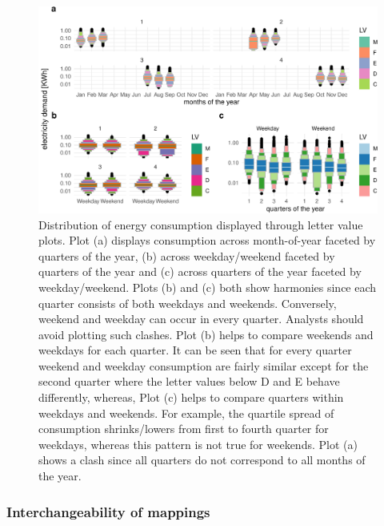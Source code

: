 \documentclass[12pt]{article}
\begin{document}
\begin{figure}

\includegraphics[width=1\linewidth]{figure/allFig-1} \hfill{}

\caption{Distribution of energy consumption displayed through letter value plots. Plot (a) displays consumption across month-of-year faceted by quarters of the year, (b) across weekday/weekend faceted by quarters of the year and (c) across quarters of the year faceted by weekday/weekend. Plots (b) and (c) both show harmonies since each quarter consists of both weekdays and weekends. Conversely, weekend and weekday can occur in every quarter. Analysts should avoid plotting such clashes. Plot (b) helps to compare weekends and weekdays for each quarter. It can be seen that for every quarter weekend and weekday consumption are fairly similar except for the second quarter where the letter values below D and E behave differently, whereas, Plot (c) helps to compare quarters within weekdays and weekends. For example, the quartile spread of consumption shrinks/lowers from first to fourth quarter for weekdays, whereas this pattern is not true for weekends. Plot (a) shows a clash since all quarters do not correspond to all months of the year.}\label{fig:allFig}
\end{figure}



\hypertarget{interchangeability-of-mappings}{%
\subsubsection{Interchangeability of mappings}\label{interchangeability-of-mappings}}
\end{document}
